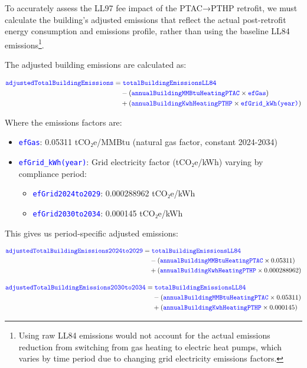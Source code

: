 \documentclass{article}
\newcommand{\code}[1]{\textcolor{blue}{\texttt{#1}}}
\begin{document}
To accurately assess the LL97 fee impact of the PTAC→PTHP retrofit, we must calculate the building's adjusted emissions that reflect the actual post-retrofit energy consumption and emissions profile, rather than using the baseline LL84 emissions\footnote{Using raw LL84 emissions would not account for the actual emissions reduction from switching from gas heating to electric heat pumps, which varies by time period due to changing grid electricity emissions factors.}.

The adjusted building emissions are calculated as:

\begin{align}
\code{adjustedTotalBuildingEmissions} &= \code{totalBuildingEmissionsLL84} \nonumber \\
&\quad - (\code{annualBuildingMMBtuHeatingPTAC} \times \code{efGas}) \nonumber \\
&\quad + (\code{annualBuildingKwhHeatingPTHP} \times \code{efGrid\_kWh(year)})
\end{align}

Where the emissions factors are:
\begin{itemize}
    \item \code{efGas}: 0.05311 tCO₂e/MMBtu (natural gas factor, constant 2024-2034)
    \item \code{efGrid\_kWh(year)}: Grid electricity factor (tCO₂e/kWh) varying by compliance period:
    \begin{itemize}
        \item \code{efGrid2024to2029}: 0.000288962 tCO₂e/kWh
        \item \code{efGrid2030to2034}: 0.000145 tCO₂e/kWh
    \end{itemize}
\end{itemize}

This gives us period-specific adjusted emissions:

\begin{align}
\code{adjustedTotalBuildingEmissions2024to2029} &= \code{totalBuildingEmissionsLL84} \nonumber \\
&\quad - (\code{annualBuildingMMBtuHeatingPTAC} \times 0.05311) \nonumber \\
&\quad + (\code{annualBuildingKwhHeatingPTHP} \times 0.000288962)
\end{align}

\begin{align}
\code{adjustedTotalBuildingEmissions2030to2034} &= \code{totalBuildingEmissionsLL84} \nonumber \\
&\quad - (\code{annualBuildingMMBtuHeatingPTAC} \times 0.05311) \nonumber \\
&\quad + (\code{annualBuildingKwhHeatingPTHP} \times 0.000145)
\end{align}
\end{document}
